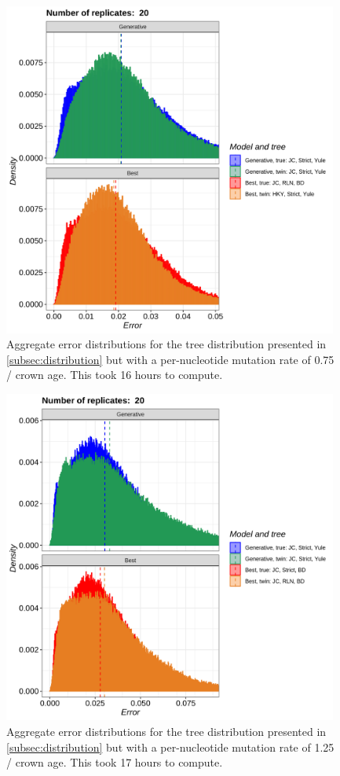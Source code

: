 \begin{figure}[H]
  \includegraphics[width=0.98\textwidth]{pirouette_example_37/errors.png}
  \caption{Aggregate error distributions for the tree distribution presented in \ref{subsec:distribution} but with a per-nucleotide mutation rate of 0.75 / crown age. This took 16 hours to compute.}
\end{figure}

\begin{figure}[H]
  \includegraphics[width=0.98\textwidth]{pirouette_example_38/errors.png}
  \caption{Aggregate error distributions for the tree distribution presented in \ref{subsec:distribution} but with a per-nucleotide mutation rate of 1.25 / crown age. This took 17 hours to compute.}
\end{figure}

